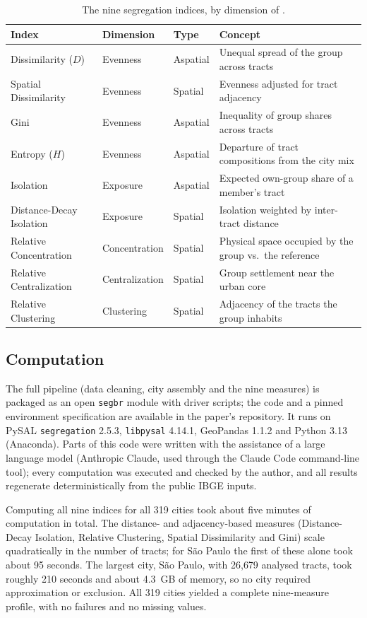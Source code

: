 \documentclass[12pt,a4paper]{article}
\begin{document}
\begin{table}[h]
\centering
\caption{The nine segregation indices, by dimension of \citet{massey1988dimensions}.}
\label{tab:measures}
\small
\begin{tabular}{lllp{6cm}}
\toprule
Index & Dimension & Type & Concept \\
\midrule
Dissimilarity ($D$) & Evenness & Aspatial & Unequal spread of the group across tracts \\
Spatial Dissimilarity & Evenness & Spatial & Evenness adjusted for tract adjacency \\
Gini & Evenness & Aspatial & Inequality of group shares across tracts \\
Entropy ($H$) & Evenness & Aspatial & Departure of tract compositions from the city mix \\
Isolation & Exposure & Aspatial & Expected own-group share of a member's tract \\
Distance-Decay Isolation & Exposure & Spatial & Isolation weighted by inter-tract distance \\
Relative Concentration & Concentration & Spatial & Physical space occupied by the group vs.\ the reference \\
Relative Centralization & Centralization & Spatial & Group settlement near the urban core \\
Relative Clustering & Clustering & Spatial & Adjacency of the tracts the group inhabits \\
\bottomrule
\end{tabular}
\end{table}

\subsection{Computation}\label{subsec:computation}

The full pipeline (data cleaning, city assembly and the nine measures) is packaged as an open \texttt{segbr} module with driver scripts; the code and a pinned environment specification are available in the paper's repository. It runs on PySAL \texttt{segregation} 2.5.3, \texttt{libpysal} 4.14.1, GeoPandas 1.1.2 and Python 3.13 (Anaconda). Parts of this code were written with the assistance of a large language model (Anthropic Claude, used through the Claude Code command-line tool); every computation was executed and checked by the author, and all results regenerate deterministically from the public IBGE inputs.

Computing all nine indices for all 319 cities took about five minutes of computation in total. The distance- and adjacency-based measures (Distance-Decay Isolation, Relative Clustering, Spatial Dissimilarity and Gini) scale quadratically in the number of tracts; for S\~ao Paulo the first of these alone took about 95 seconds. The largest city, S\~ao Paulo, with 26{,}679 analysed tracts, took roughly 210 seconds and about 4.3~GB of memory, so no city required approximation or exclusion. All 319 cities yielded a complete nine-measure profile, with no failures and no missing values.
\end{document}

